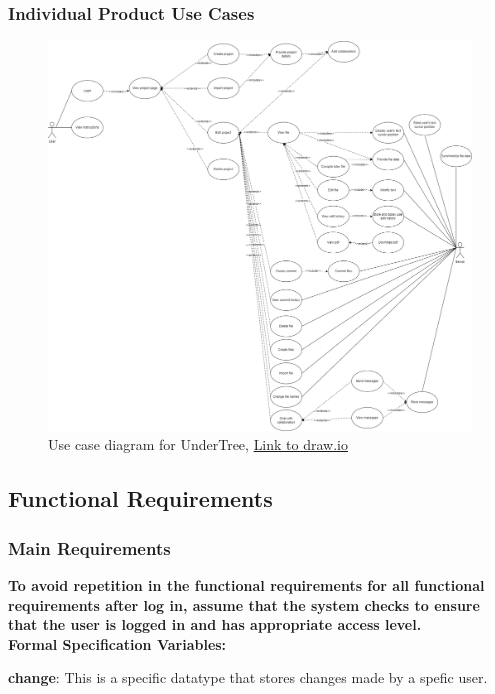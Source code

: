 \documentclass[12pt, titlepage]{article}
\begin{document}
	\subsubsection{Individual Product Use Cases}
	\begin{figure}[H]
		\centering
		\includegraphics[scale=0.35]{use_case.png}
		\caption{Use case diagram for UnderTree, \href{https://drive.google.com/file/d/1Qnl_AmKnUPbMSakRkb6BuVxByL-jOyM9/view?usp=sharing}{Link to draw.io}}
	\end{figure}
	\restoregeometry
	
	\subsection{Functional Requirements}
	
	\subsubsection{Main Requirements}
	
	\textbf{To avoid repetition in the functional requirements for all functional requirements after log in, assume that the system checks to ensure that the user is logged in and has appropriate access level.}\\
	
	\noindent \textbf{Formal Specification Variables:}
	
	\noindent \textbf{change}: This is a specific datatype that stores changes made by a spefic user.
	
\end{document}
